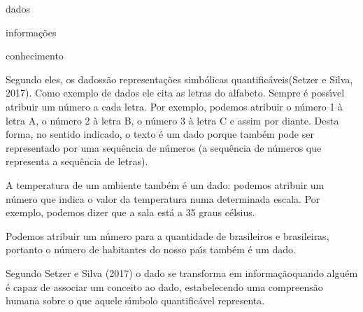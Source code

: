 \documentclass[
12pt,		%
openright,	%
twoside,  %
a4paper,			%
chapter=TITLE,		%
english,			%
french,				%
spanish,			%
brazil				%
]{USPSC-classe/USPSC}
\begin{document}
\begin{alineas}
\item dados
\item informa\c{c}\~oes
\item conhecimento
\end{alineas}

Segundo eles, os \textquotedbl dados\textquotedbl  s\~ao \textquotedbl representa\c{c}\~oes simb\'olicas quantific\'aveis\textquotedbl   (Setzer e Silva, 2017). Como exemplo de dados ele cita as letras do alfabeto. Sempre \'e poss\'{\i}vel atribuir um n\'umero a cada letra. Por exemplo, podemos atribuir o n\'umero 1 \`a letra A, o n\'umero 2 \`a letra B, o n\'umero 3 \`a letra C e assim por diante. Desta forma, no sentido indicado, o texto \'e um dado porque tamb\'em pode ser representado por uma sequ\^encia de n\'umeros (a sequ\^encia de n\'umeros que representa a sequ\^encia de letras).

















A temperatura de um ambiente tamb\'em \'e um dado: podemos atribuir um n\'umero que indica o valor da temperatura numa determinada escala. Por exemplo, podemos dizer que a sala \textquotedbl est\'a a 35 graus c\'elsius\textquotedbl .

















Podemos atribuir um n\'umero para a quantidade de brasileiros e brasileiras, portanto o n\'umero de habitantes do nosso pa\'{\i}s tamb\'em \'e um dado.

















Segundo Setzer e Silva (2017) o dado se transforma em \textquotedbl informa\c{c}\~ao\textquotedbl  quando algu\'em \'e capaz de associar um conceito ao dado, estabelecendo uma compreens\~ao humana sobre o que aquele s\'{\i}mbolo quantific\'avel representa.
\end{document}
